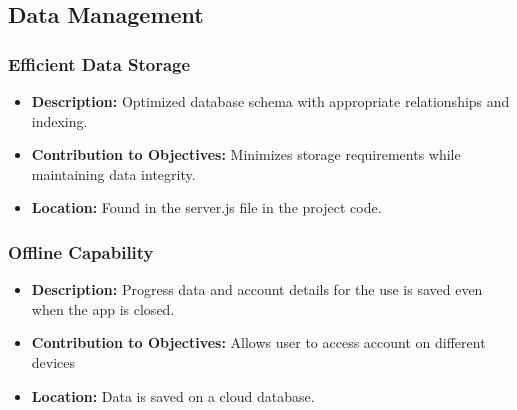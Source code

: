 \subsection{Data Management}
\subsubsection{Efficient Data Storage}
\begin{itemize}
    \item \textbf{Description:} Optimized database schema with appropriate relationships and indexing.
    \item \textbf{Contribution to Objectives:} Minimizes storage requirements while maintaining data integrity.
    \item \textbf{Location:} Found in the server.js file in the project code.
\end{itemize}

\subsubsection{Offline Capability}
\begin{itemize}
    \item \textbf{Description:} Progress data and account details for the use is saved even when the app is closed.
    \item \textbf{Contribution to Objectives:} Allows user to access account on different devices
    \item \textbf{Location:} Data is saved on a cloud database.
\end{itemize}

\label{sect:non-functional-specifications}
